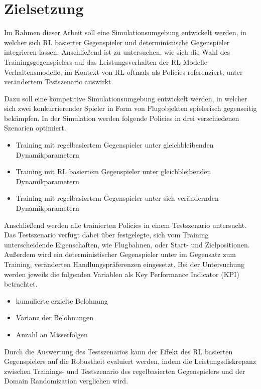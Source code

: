 \section{Zielsetzung}

Im Rahmen dieser Arbeit soll eine Simulationsumgebung entwickelt werden, in welcher sich RL basierter Gegenspieler und deterministische Gegenspieler integrieren lassen.
Anschließend ist zu untersuchen, wie sich die Wahl des Trainingsgegenspielers auf das Leistungsverhalten der RL Modelle Verhaltensmodelle, im Kontext von RL oftmals als Policies referenziert, unter verändertem Testszenario auswirkt.

Dazu soll eine kompetitive Simulationsumgebung entwickelt werden, in welcher sich zwei konkurrierender Spieler in Form von Flugobjekten spielerisch gegenseitig bekämpfen.
In der Simulation werden folgende Policies in drei verschiedenen Szenarien optimiert.

\begin{itemize}
    \item Training mit regelbasiertem Gegenspieler unter gleichbleibenden Dynamikparametern
    \item Training mit RL basiertem Gegenspieler unter gleichbleibenden Dynamikparametern
    \item Training mit regelbasiertem Gegenspieler unter sich verändernden Dynamikparametern
\end{itemize}

Anschließend werden alle trainierten Policies in einem Testszenario untersucht.
Das Testszenario verfügt dabei über festgelegte, sich vom Training unterscheidende Eigenschaften, wie Flugbahnen, oder Start- und Zielpositionen.
Außerdem wird ein deterministischer Gegenspieler unter im Gegensatz zum Training, veränderten Handlungspräferenzen eingesetzt.
Bei der Untersuchung werden jeweils die folgenden Variablen als Key Performance Indicator (KPI) betrachtet.
\begin{itemize}
    \item kumulierte erzielte Belohnung
    \item Varianz der Belohnungen
    \item Anzahl an Misserfolgen
\end{itemize}

Durch die Auswertung des Testszenarios kann der Effekt des RL basierten Gegenspielers auf die Robustheit evaluiert werden, indem die Leistungsdiskrepanz zwischen Trainings- und Testszenario des regelbasierten Gegenspielers und der Domain Randomization verglichen wird.

